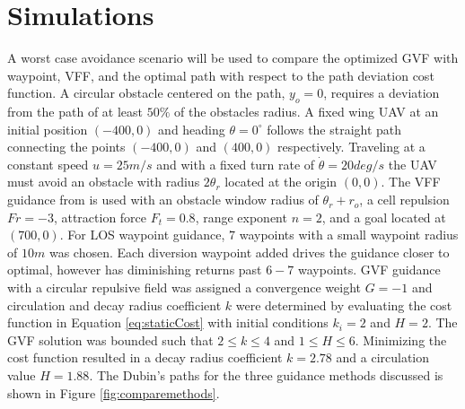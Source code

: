 \documentclass[conf]{new-aiaa}
\begin{document}
%
%



\section{Simulations}

A worst case avoidance scenario will be used to compare the optimized GVF with waypoint, VFF, and the optimal path with respect to the path deviation cost function. A circular obstacle centered on the path, $y_o = 0$, requires a deviation from the path of at least $50\% $ of the obstacles radius. A fixed wing UAV at an initial position $(-400,0)$ and heading $\theta=0^\circ$ follows the straight path connecting the points $(-400,0)$ and $(400,0)$ respectively. Traveling at a constant speed $u=25 m/s$ and with a fixed turn rate of $\dot{\theta}=20 deg/s$ the UAV must avoid an obstacle with radius $2\theta_r$ located at the origin $(0,0)$. The VFF guidance from \cite{borenstein_real-time_1990} is used with an obstacle window radius of $\theta_r+r_o$, a cell repulsion $Fr=-3$, attraction force $F_t=0.8$, range exponent $n=2$, and a goal located at $(700,0)$. For LOS waypoint guidance, $7$ waypoints with a small waypoint radius of $10m$ was chosen. Each diversion waypoint added drives the guidance closer to optimal, however has diminishing returns past $6-7$ waypoints. GVF guidance with a circular repulsive field was assigned a convergence weight $G=-1$ and circulation and decay radius coefficient $k$ were determined by evaluating the cost function in Equation \ref{eq:staticCost} with initial conditions $k_i = 2$ and $H=2$. The GVF solution was bounded such that $2\leq k\leq 4$ and $1\leq H\leq 6$.  Minimizing the cost function resulted in a decay radius coefficient $k=2.78$ and a circulation value $H=1.88$. The Dubin's paths for the three guidance methods discussed is shown in Figure \ref{fig:comparemethods}. \\
\end{document}

